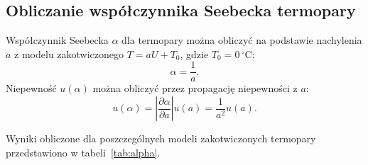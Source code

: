 \documentclass[12pt, a4paper]{article}
\begin{document}
\subsection{Obliczanie współczynnika Seebecka termopary}
Współczynnik Seebecka $\alpha$ dla termopary można obliczyć na podstawie
nachylenia $a$ z modelu zakotwiczonego $T = aU + T_0$, gdzie $T_0 =
    0\,^\circ\mathrm{C}$:
\begin{equation}
    \alpha = \frac{1}{a}.
\end{equation}
Niepewność $u(\alpha)$ można obliczyć przez propagację niepewności z $a$:
\begin{equation}
    u(\alpha) = \left| \frac{\partial \alpha}{\partial a} \right| u(a) = \frac{1}{a^2} u(a).
\end{equation}

Wyniki obliczone dla poszczególnych modeli zakotwiczonych termopary
przedstawiono w tabeli~\ref{tab:alpha}.
\end{document}
